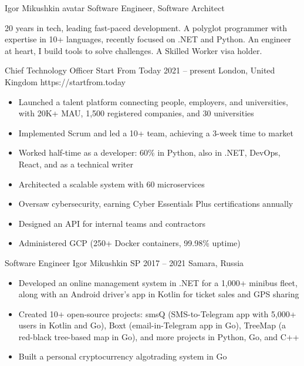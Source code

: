 \documentclass[9pt,a4paper]{juicv}
\begin{document}
\begin{paracol}{2}
\cvMakeHeader
    {Igor Mikushkin}
    {avatar}
    {Software Engineer, Software Architect}

    20 years in tech, leading fast-paced development.
    A polyglot programmer with expertise in 10+ languages, recently focused on .NET and Python.
    An engineer at heart, I build tools to solve challenges.
    A Skilled Worker visa holder.

    \cvLeftEvent
        {Chief Technology Officer}
        {Start From Today}
        {2021 -- present}
        {London, United Kingdom}
        {https://startfrom.today}

        \begin{itemize}
            \item Launched a talent platform connecting people, employers, and universities,
                  with 20K+ MAU, 1,500 registered companies, and 30 universities
            \item Implemented Scrum and led a 10+ team,
                  achieving a 3-week time to market
            \item Worked half-time as a developer: 60\% in Python,
                  also in .NET, DevOps, React, and as a technical writer
            \item Architected a scalable system with 60 microservices
            \item Oversaw cybersecurity, earning Cyber Essentials Plus certifications annually
            \item Designed an API for internal teams and contractors
            \item Administered GCP (250+ Docker containers, 99.98\% uptime)
        \end{itemize}

    \cvLeftEvent
        {Software Engineer}
        {Igor Mikushkin SP}
        {2017 -- 2021}
        {Samara, Russia}
        {}

        \begin{itemize}
            \item Developed an online management system in .NET for a 1,000+ minibus fleet,
                  along with an Android driver’s app in Kotlin for ticket sales and GPS sharing
            \item Created 10+ open-source projects:
                  smsQ (SMS-to-Telegram app with 5,000+ users in Kotlin and Go),
                  Boxt (email-in-Telegram app in Go),
                  TreeMap (a red-black tree-based map in Go),
                  and more projects in Python, Go, and C++
            \item Built a personal cryptocurrency algotrading system in Go
        \end{itemize}


\end{paracol}
\end{document}
